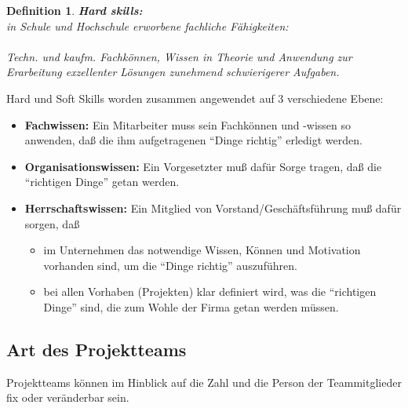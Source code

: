 \documentclass[11pt,a4paper]{article}
\newenvironment{de}[1]
{\begin{mdframed}[style=de]\begin{mydef}{\textbf{#1:}}\\} 
{\end{mydef}\end{mdframed}}
\newtheorem{mydef}{Definition}
\begin{document}
\begin{de}{Hard skills}
in Schule und Hochschule erworbene fachliche Fähigkeiten:\\
\\
Techn. und kaufm. Fachkönnen, Wissen in Theorie und Anwendung zur
Erarbeitung exzellenter Lösungen zunehmend schwierigerer Aufgaben.
\end{de}
\noindent
Hard und Soft Skills worden zusammen angewendet auf 3 verschiedene Ebene:
\begin{itemize}
\item \textbf{Fachwissen:} Ein Mitarbeiter muss sein Fachkönnen und -wissen so
anwenden, daß die ihm aufgetragenen ``Dinge richtig'' erledigt werden.
\item \textbf{Organisationswissen:} Ein Vorgesetzter muß dafür Sorge tragen, daß die
``richtigen Dinge'' getan werden.
\item \textbf{Herrschaftswissen:} Ein Mitglied von Vorstand/Geschäftsführung muß
dafür sorgen, daß
\begin{itemize}
	\item im Unternehmen das notwendige Wissen, Können und Motivation
vorhanden sind, um die ``Dinge richtig'' auszuführen.
	\item bei allen Vorhaben (Projekten) klar definiert wird, was die ``richtigen
Dinge'' sind, die zum Wohle der Firma getan werden müssen.
\end{itemize}
\end{itemize}
\subsection{Art des Projektteams}
Projektteams können im Hinblick auf die Zahl und die
Person der Teammitglieder fix oder veränderbar sein.
\end{document}

